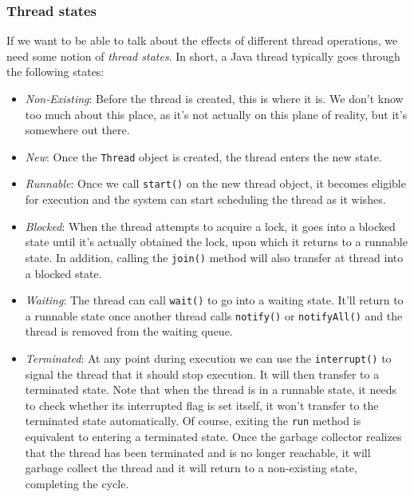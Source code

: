\documentclass[main]{subfiles}
\begin{document}
\subsubsection{Thread states}
If we want to be able to talk about the effects of different thread operations, we need some notion of \textit{thread states}. In short, a Java thread typically goes through the following states:
\begin{itemize}
    \item \textit{Non-Existing}: Before the thread is created, this is where it is. We don't know too much about this place, as it's not actually on this plane of reality, but it's somewhere out there.
    \item \textit{New}: Once the \texttt{Thread} object is created, the thread enters the new state.
    \item \textit{Runnable}: Once we call \texttt{start()} on the new thread object, it becomes eligible for execution and the system can start scheduling the thread as it wishes.
    \item \textit{Blocked}: When the thread attempts to acquire a lock, it goes into a blocked state until it's actually obtained the lock, upon which it returns to a runnable state. In addition, calling the \texttt{join()} method will also transfer at thread into a blocked state.
    \item \textit{Waiting}: The thread can call \texttt{wait()} to go into a waiting state. It'll return to a runnable state once another thread calls \texttt{notify()} or \texttt{notifyAll()} and the thread is removed from the waiting queue.
    \item \textit{Terminated}: At any point during execution we can use the \texttt{interrupt()} to signal the thread that it should stop execution. It will then transfer to a terminated state. Note that when the thread is in a runnable state, it needs to check whether its interrupted flag is set itself, it won't transfer to the terminated state automatically. Of course, exiting the \texttt{run} method is equivalent to entering a terminated state. Once the garbage collector realizes that the thread has been terminated and is no longer reachable, it will garbage collect the thread and it will return to a non-existing state, completing the cycle.
\end{itemize}
\end{document}
